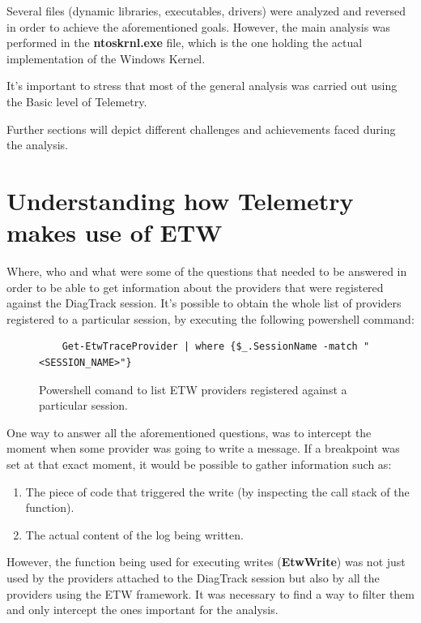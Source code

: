 
Several files (dynamic libraries, executables, drivers) were analyzed and reversed in order to achieve the aforementioned goals. However, the main analysis was performed in the {\bfseries ntoskrnl.exe} file, which is the one holding the actual implementation of the Windows Kernel.

It's important to stress that most of the general analysis was carried out using the Basic level of Telemetry. 

Further sections will depict different challenges and achievements faced during the analysis.






\section{Understanding how Telemetry makes use of ETW}
Where, who and what were some of the questions that needed to be answered in order to be able to get information about the providers that were registered against the DiagTrack session. 
It's possible to obtain the whole list of providers registered to a particular session, by executing the following powershell command: 

\begin{figure}[H]
  \begin{lstlisting}
    Get-EtwTraceProvider | where {$_.SessionName -match "<SESSION_NAME>"}
  \end{lstlisting} 
  \caption[]{Powershell comand to list ETW providers registered against a particular session. }
  \label{fig:powershell_cmd}
\end{figure}

One way to answer all the aforementioned questions, was to intercept the moment when some provider was going to write a message. If a breakpoint was set at that exact moment, it would be possible to gather information such as: 
\begin{enumerate}
\item The piece of code that triggered the write (by inspecting the call stack of the function).
\item The actual content of the log being written.
\end{enumerate} 
However, the function being used for executing writes ({\bfseries EtwWrite}) was not just used by the providers attached to the DiagTrack session but also by all the providers using the ETW framework. It was necessary to find a way to filter them and only intercept the ones important for the analysis. 

